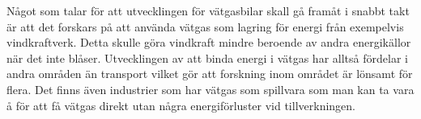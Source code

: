 \documentclass[a4paper,11pt,fleqn, titlepage]{article}
\begin{document}
Något som talar för att utvecklingen för vätgasbilar skall gå framåt i snabbt takt är att det forskars på att använda vätgas som lagring för energi från exempelvis vindkraftverk. Detta skulle göra vindkraft mindre beroende av andra energikällor när det inte blåser. Utvecklingen av att binda energi i vätgas har alltså fördelar i andra områden än transport vilket gör att forskning inom området är lönsamt för flera. Det finns även industrier som har vätgas som spillvara som man kan ta vara å för att få vätgas direkt utan några energiförluster vid tillverkningen.


\printbibliography
\end{document}
